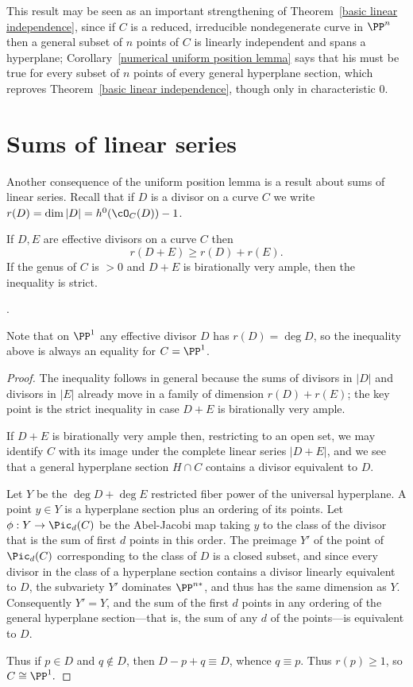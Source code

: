 This result may be seen as an important strengthening of Theorem~\ref{basic linear independence}, since if $C$ is a reduced, irreducible nondegenerate curve in $\PP^n$ then a general subset of $n$ points of $C$ is linearly independent and spans a hyperplane; Corollary~\ref{numerical uniform position lemma} says that his must
be true for every subset of $n$ points of every general hyperplane section, 
which reproves Theorem~\ref{basic linear independence}, though only in characteristic 0. 

\section{Sums of linear series}

Another consequence of the uniform position lemma is a result about sums of linear series.
Recall that if $D$ is a divisor on a curve $C$ we write $r(D) = \dim |D| = h^0(\cO_C(D))-1$.

\begin{corollary}\label{Clifford equality plus}
If $D,E$ are effective divisors on a curve $C$ then
$$
r(D+E) \geq r(D)+r(E).
$$
If the genus of $C$ is $>0$ and $D+E$ is birationally very ample, then the inequality is strict.
\end{corollary}.

Note that on $\PP^1$ any effective divisor $D$ has $r(D) = \deg D$, so the inequality above is
always an equality for $C = \PP^1$.

\begin{proof}
 The inequality follows in general because the sums of divisors in $|D|$ and divisors in $|E|$ already move in 
 a family of dimension $r(D)+r(E)$; the key point is the strict inequality in case $D+E$ is birationally very ample.
 
If $D+E$ is birationally very ample then, restricting to an open set,
we may identify $C$ with its image under the complete linear series $|D+E|$, and we see that a general hyperplane section $H\cap C$ contains a divisor equivalent to $D$.

Let $Y$ be the $\deg D +\deg E$ restricted fiber power of the universal hyperplane.
A point $y\in Y$ is a hyperplane section plus an ordering of its points.  Let $\phi: Y \to \Pic_d(C)$ be the Abel-Jacobi map taking $y$
 to the class of the divisor that is the sum of first $d$ points in this order. The preimage  $Y'$ of the point of $\Pic_d(C)$ corresponding to the class of $D$ is a closed subset, and
since every divisor in the class of a hyperplane section contains a divisor
linearly equivalent to  $D$, the subvariety $Y'$ dominates $\PP^{n*}$, and thus
has the same dimension as $Y$. Consequently $Y'=Y$, and the sum of the first $d$ points
in any ordering of the general hyperplane section---that is, the sum of any $d$
of the points---is equivalent to $D$.

Thus if $p\in D$ and $q\notin D$, then $D-p+q \equiv D$, whence $q\equiv p$. Thus
$r(p)\geq 1$, so $C\cong \PP^1.$
\end{proof}

